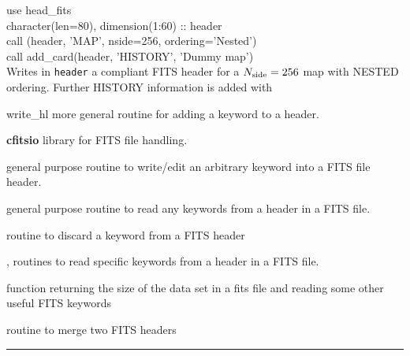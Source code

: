 \begin{arguments}
{\begin{tabular}{p{0.30\hsize} p{0.05\hsize} p{0.08\hsize} p{0.49\hsize}}
\end{tabular}
}
\end{arguments}

\begin{example}
{
use head\_fits \\
character(len=80), dimension(1:60) :: header \\
call \thedocid(header, 'MAP', nside=256, ordering='Nested')  \\
call add\_card(header, 'HISTORY', 'Dummy map')\\
}
{
Writes in {\tt header} a \healpix compliant FITS header for a ${N_{\rm side}}=256$ map with NESTED
ordering. Further HISTORY information is added with 
}
\end{example}

\begin{modules}
  \begin{sulist}{} %
  \item[write\_hl] more general routine for adding a keyword to a header.
  \item[\textbf{cfitsio}] library for FITS file handling.		
  \end{sulist}
\end{modules}

\begin{related}
  \begin{sulist}{} %
  \item[\htmlref{add\_card}{sub:add_card}] general purpose routine to write/edit an arbitrary
keyword into a FITS file header.
  \item[\htmlref{get\_card}{sub:get_card}] general purpose routine to read any keywords from a header in a FITS file.
  \item[\htmlref{del\_card}{sub:del_card}] routine to discard a keyword from a FITS header
  \item[\htmlref{read\_par}{sub:read_par}, \htmlref{number\_of\_alms}{sub:number_of_alms}] routines to read specific keywords from a
  header in a FITS file.
  \item[\htmlref{getsize\_fits}{sub:getsize_fits}] function returning the size of the data set in a fits
  file and reading some other useful FITS keywords
  \item[\htmlref{merge\_headers}{sub:merge_headers}] routine to merge two FITS headers
  \end{sulist}
\end{related}

\rule{\hsize}{2mm}

\newpage
